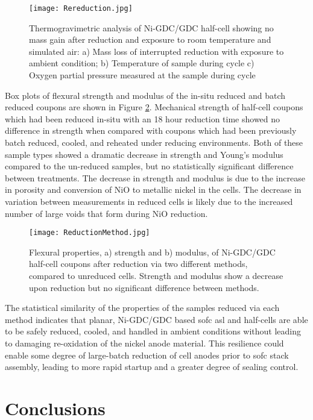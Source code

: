 \begin{figure}
    \texttt{[image: Rereduction.jpg]}
    \caption{Thermogravimetric analysis of Ni-GDC/GDC half-cell showing no mass gain after reduction and exposure to room temperature and simulated air: a) Mass loss of interrupted reduction with exposure to ambient condition; b) Temperature of sample during cycle c) Oxygen partial pressure measured at the sample during cycle}
    \label{fig:rereduction}
\end{figure}

Box plots of flexural strength and modulus of the in-situ reduced and batch reduced coupons are shown in Figure \ref{fig:reductionmethod}.
Mechanical strength of half-cell coupons which had been reduced in-situ with an 18 hour reduction time showed no difference in strength when compared with coupons which had been previously batch reduced, cooled, and reheated under reducing environments.
Both of these sample types showed a dramatic decrease in strength and Young's modulus compared to the un-reduced samples, but no statistically significant difference between treatments.
The decrease in strength and modulus is due to the increase in porosity and conversion of NiO to metallic nickel in the cells.
The decrease in variation between measurements in reduced cells is likely due to the increased number of large voids that form during NiO reduction.

\begin{figure}
    \texttt{[image: ReductionMethod.jpg]}
    \caption{Flexural properties, a) strength and b) modulus, of Ni-GDC/GDC half-cell coupons after reduction via two different methods, compared to unreduced cells. Strength and modulus show a decrease upon reduction but no significant difference between methods.}
    \label{fig:reductionmethod}
\end{figure}

The statistical similarity of the properties of the samples reduced via each method indicates that planar, Ni-GDC/GDC based \gls{sofc} \gls{asl} and half-cells are able to be safely reduced, cooled, and handled in ambient conditions without leading to damaging re-oxidation of the nickel anode material.
This resilience could enable some degree of large-batch reduction of cell anodes prior to \gls{sofc} stack assembly, leading to more rapid startup and a greater degree of sealing control.

\section{Conclusions}

